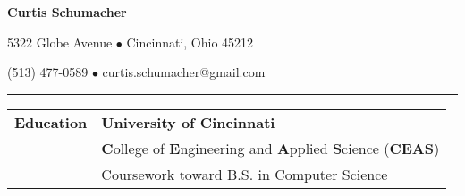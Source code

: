 \documentclass[11pt]{article} %
\begin{document}
	\huge{\centerline{\textbf{Curtis Schumacher}}}
	\large
	\centerline{5322 Globe Avenue $\bullet$ Cincinnati, Ohio 45212}
	\centerline{(513) 477-0589 $\bullet$ curtis.schumacher@gmail.com}
	\vspace*{.75\baselineskip}\hrule\vspace*{1\baselineskip}
\begin{small}	
	\begin{tabular}[t]{p{3cm} p{16cm}}\large{\textbf{Education}}
    				& \textbf{University of Cincinnati} \color{gray}{Fall 2010 - Winter 2016}\\
    				& \textbf{C}ollege of \textbf{E}ngineering and \textbf{A}pplied \textbf{S}cience (\textbf{CEAS}) \\
    				& Coursework toward B.S. in Computer Science \\
			\end{tabular}
			

\end{small}
\end{document}
